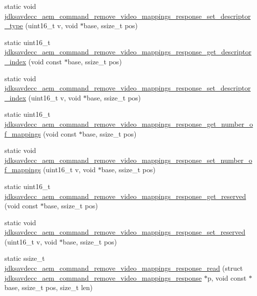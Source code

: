 \begin{DoxyCompactItemize}
\item 
static void \hyperlink{group__command__remove__video__mappings__response_gac36d1e32e8ab7058b210d27a12695c54}{jdksavdecc\+\_\+aem\+\_\+command\+\_\+remove\+\_\+video\+\_\+mappings\+\_\+response\+\_\+set\+\_\+descriptor\+\_\+type} (uint16\+\_\+t v, void $\ast$base, ssize\+\_\+t pos)
\item 
static uint16\+\_\+t \hyperlink{group__command__remove__video__mappings__response_gaca85ac2717b085424bc704f6576f48d9}{jdksavdecc\+\_\+aem\+\_\+command\+\_\+remove\+\_\+video\+\_\+mappings\+\_\+response\+\_\+get\+\_\+descriptor\+\_\+index} (void const $\ast$base, ssize\+\_\+t pos)
\item 
static void \hyperlink{group__command__remove__video__mappings__response_ga92ddd638b57099a74562d58398175cbb}{jdksavdecc\+\_\+aem\+\_\+command\+\_\+remove\+\_\+video\+\_\+mappings\+\_\+response\+\_\+set\+\_\+descriptor\+\_\+index} (uint16\+\_\+t v, void $\ast$base, ssize\+\_\+t pos)
\item 
static uint16\+\_\+t \hyperlink{group__command__remove__video__mappings__response_gab6076d14b847a7c7f8f5daa37a6282bd}{jdksavdecc\+\_\+aem\+\_\+command\+\_\+remove\+\_\+video\+\_\+mappings\+\_\+response\+\_\+get\+\_\+number\+\_\+of\+\_\+mappings} (void const $\ast$base, ssize\+\_\+t pos)
\item 
static void \hyperlink{group__command__remove__video__mappings__response_ga6d0f69351d9d30076b68e6f8f293c922}{jdksavdecc\+\_\+aem\+\_\+command\+\_\+remove\+\_\+video\+\_\+mappings\+\_\+response\+\_\+set\+\_\+number\+\_\+of\+\_\+mappings} (uint16\+\_\+t v, void $\ast$base, ssize\+\_\+t pos)
\item 
static uint16\+\_\+t \hyperlink{group__command__remove__video__mappings__response_gafae49e23eca389d75e3f15b21d654928}{jdksavdecc\+\_\+aem\+\_\+command\+\_\+remove\+\_\+video\+\_\+mappings\+\_\+response\+\_\+get\+\_\+reserved} (void const $\ast$base, ssize\+\_\+t pos)
\item 
static void \hyperlink{group__command__remove__video__mappings__response_gab3b3c84fe35b018371aac97a0a3dea1d}{jdksavdecc\+\_\+aem\+\_\+command\+\_\+remove\+\_\+video\+\_\+mappings\+\_\+response\+\_\+set\+\_\+reserved} (uint16\+\_\+t v, void $\ast$base, ssize\+\_\+t pos)
\item 
static ssize\+\_\+t \hyperlink{group__command__remove__video__mappings__response_gad78cadfdea3e2b9a02e123db98eb3761}{jdksavdecc\+\_\+aem\+\_\+command\+\_\+remove\+\_\+video\+\_\+mappings\+\_\+response\+\_\+read} (struct \hyperlink{structjdksavdecc__aem__command__remove__video__mappings__response}{jdksavdecc\+\_\+aem\+\_\+command\+\_\+remove\+\_\+video\+\_\+mappings\+\_\+response} $\ast$p, void const $\ast$base, ssize\+\_\+t pos, size\+\_\+t len)

\end{DoxyCompactItemize}
